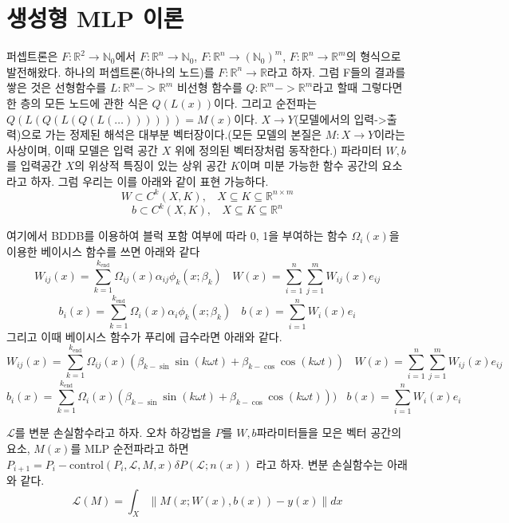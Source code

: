 \documentclass{book}
\begin{document}
\chapter{생성형 MLP 이론}
퍼셉트론은 $F:\mathbb{R}^2 \rightarrow \mathbb{N}_0$에서 $F:\mathbb{R}^n \rightarrow \mathbb{N}_0$, $F:\mathbb{R}^n \rightarrow (\mathbb{N}_0)^m$, $F:\mathbb{R}^n \rightarrow \mathbb{R}^m$의 형식으로 발전해왔다. 
\newline\newline
하나의 퍼셉트론(하나의 노드)를 $F:\mathbb{R}^n \rightarrow \mathbb{R}$라고 하자. 그럼 F들의 결과를 쌓은 것은 선형함수를 $L:\mathbb{R}^n->\mathbb{R}^m$ 비선형 함수를 $Q:\mathbb{R}^m->\mathbb{R}^m$라고 할때 그렇다면 한 층의 모든 노드에 관한 식은 $Q(L(x))$이다. 그리고 순전파는 $Q(L(Q(L(Q(L(\ldots))))))=M(x)$이다. $X \rightarrow Y$(모델에서의 입력->출력)으로 가는 정제된 해석은 대부분 벡터장이다.(모든 모델의 본질은 $M:X \rightarrow Y$이라는 사상이며, 이때 모델은 입력 공간 $X$ 위에 정의된 벡터장처럼 동작한다.)
\newline\newline
파라미터 $W,b$를 입력공간 $X$의 위상적 특징이 있는 상위 공간 $K$이며 미분 가능한 함수 공간의 요소라고 하자. 그럼 우리는 이를 아래와 같이 표현 가능하다.
\[
W \subset C^k(X, K),~~~~ X \subseteq K \subseteq \mathbb{R}^{n \times m}
\]
\[
b \subset C^k(X, K),~~~~ X \subseteq K \subseteq \mathbb{R}^{n}
\]

여기에서 BDDB를 이용하여 블럭 포함 여부에 따라 0, 1을 부여하는 함수 $\Omega_i(x)$을 이용한 베이시스 함수를 쓰면 아래와 같다
\[
W_{ij}(x) = \sum_{k = 1}^{k_\text{end}} \Omega_{ij}(x) \alpha_{ij} \phi_k(x;\beta_k) ~~~~ W(x)=\sum_{i=1}^{n} \sum_{j=1}^{m} W_{ij}(x) e_{ij}
\]
\[
b_{i}(x) = \sum_{k = 1}^{k_\text{end}} \Omega_{i}(x) \alpha_{i} \phi_k(x;\beta_k) ~~~~ b(x)=\sum_{i=1}^{n} W_{i}(x) e_{i}
\]
그리고 이때 베이시스 함수가 푸리에 급수라면 아래와 같다.
\[
W_{ij}(x) = \sum_{k = 1}^{k_\text{end}} \Omega_{ij}(x) \left( \beta_{k-\sin} \sin(k \omega t) + \beta_{k-\cos} \cos(k \omega t) \right) ~~~~ W(x)=\sum_{i=1}^{n} \sum_{j=1}^{m} W_{ij}(x) e_{ij}
\]
\[
b_{i}(x) = \sum_{k = 1}^{k_\text{end}} \Omega_{i}(x) \left( \beta_{k-\sin} \sin(k \omega t) + \beta_{k-\cos} \cos(k \omega t) \right)) ~~~~ b(x)=\sum_{i=1}^{n} W_{i}(x) e_{i}
\]

$\mathcal{L}$를 변분 손실함수라고 하자. 오차 하강법을 $P$를 $W,b$파라미터들을 모은 벡터 공간의 요소, $M(x)$를 MLP 순전파라고 하면 $P_{i+1} = P_i - \text{control}(P_i, \mathcal{L}, M, x) \delta P(\mathcal{L};n(x))$ 라고 하자. 변분 손실함수는 아래와 같다.
\[
\mathcal{L}(M)=\int_{X} \lVert M(x;W(x),b(x)) - y(x) \rVert dx
\]
\end{document}
